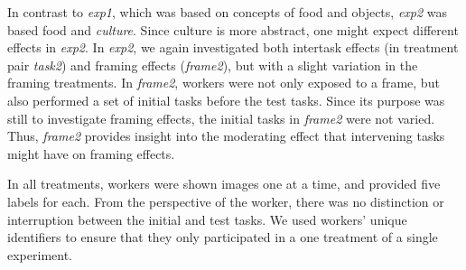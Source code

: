 \documentclass[12pt]{article}
\begin{document}
In contrast to \textit{exp1}, which was based on concepts of food and
objects, \textit{exp2} was based food and \textit{culture}.
Since culture is more abstract, one might expect different effects 
in \textit{exp2}.  In \textit{exp2}, we again investigated both
intertask effects (in treatment pair \textit{task2}) and framing effects 
(\textit{frame2}), but with a slight variation in the framing treatments.
In \textit{frame2}, workers were not only exposed to a frame, but also 
performed a set of initial tasks before the test tasks.  Since its purpose 
was still
to investigate framing effects, the initial tasks in \textit{frame2}
were not varied. Thus, \textit{frame2} provides insight into the moderating 
effect that intervening tasks might have on framing effects.

In all treatments, workers were shown images one at a time, and provided five 
labels for each.  From the perspective of the worker, there was no
distinction or interruption between the initial and test tasks.  We used
workers' unique identifiers to ensure that they only participated in a 
one treatment of a single experiment.
\end{document}
